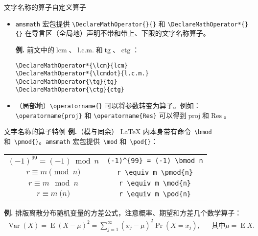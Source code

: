 \documentclass[mathserif]{beamer}
\newcommand{\codegreen}[1]{\textcolor{codegreen}{#1}}
\DeclareMathOperator{\tg}{tg}
\DeclareMathOperator{\ctg}{ctg}
\newenvironment{instance}{\zihao{-5}\textbf{\songti \codegreen{例.}}}{\hfill\par}
\begin{document}
\begin{frame}[fragile]{文字名称的算子}{自定义算子}
\begin{itemize}

\item \verb^amsmath^ 宏包提供 \lstinline'\DeclareMathOperator{}{}' 和 \lstinline'\DeclareMathOperator*{}{}' 在导言区（全局地）声明不带和带上、下限的文字名称算子。

\begin{instance}
前文中的$\operatorname{lcm}$、$\operatorname{l.c.m.}$和$\operatorname{tg}$、$\operatorname{ctg}$：
\begin{lstlisting}
\DeclareMathOperator*{\lcm}{lcm}
\DeclareMathOperator*{\lcmdot}{l.c.m.}
\DeclareMathOperator{\tg}{tg}
\DeclareMathOperator{\ctg}{ctg}
\end{lstlisting}
\end{instance}

\item （局部地）\lstinline'\operatorname{}' 可以将参数转变为算子。例如：\lstinline'\operatorname{proj}' 和 \lstinline'\operatorname{Res}' 可以得到$\operatorname{proj}$和$\operatorname{Res}$。

\end{itemize}
\end{frame}

\begin{frame}[fragile]{文字名称的算子}{特例}
\begin{instance}（模与同余）
	\LaTeX{} 内本身带有命令\ {\rm\lstinline'\bmod'} 和\ {\rm\lstinline'\pmod{}'}。\verb^amsmath^ 宏包提供\ {\rm\lstinline'\mod'} 和\ {\rm\lstinline'\pod{}'}：
\begin{table}[H]
\centering
\begin{tabular}{cc}
	\toprule
	$(-1)^{99} = (-1) \bmod n$ & \rm\lstinline'(-1)^{99} = (-1) \bmod n' \\
	$r \equiv m \pmod{n}$ & \rm\lstinline'r \equiv m \pmod{n}' \\
	$r \equiv m \mod{n}$ & \rm\lstinline'r \equiv m \mod{n}' \\
	$r \equiv m \pod{n}$ & \rm\lstinline'r \equiv m \pod{n}' \\
	\bottomrule
\end{tabular}
\end{table}
\end{instance}
\begin{instance}
	排版离散分布随机变量的方差公式，注意概率、期望和方差几个数学算子：\cite{LaTeX入门}
\begin{equation*}
	\begin{aligned}
	\operatorname{Var} \left( X \right) = \operatorname{E} (X - \mu)^{2} = \sum_{j=1}^{\infty} (x_{j} - \mu)^{2} \Pr(X = x_{j}), &&
	\text{其中$\mu = \operatorname{E} X$.}
	\end{aligned}
\end{equation*}
\end{instance}
\end{frame}
\end{document}

